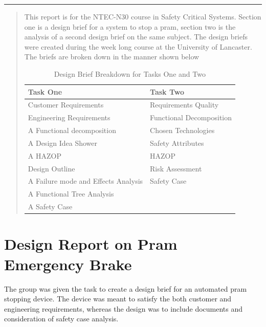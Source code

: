 \documentclass[12pt,a4paper]{article}
\begin{document}
\thispagestyle{fancy}
\renewcommand{\contentsname}{List of Contents{\color{Blue} \hrule width300pt height0.02pt}}
\textcolor{Grey}{\tableofcontents}
\renewcommand{\listfigurename}{List of Figures {\color{Blue} \hrule width250pt height0.01pt}}
\textcolor{Grey}{\listoffigures}
\renewcommand{\listtablename}{List of Tables {\color{Blue} \hrule width250pt height0.01pt}}
\textcolor{Grey}{\listoftables}
\newpage


\thispagestyle{abstract}
\renewcommand{\abstractname}{\large \textsf{Executive Summary} {\color{Blue} \hrule width250pt height0.01pt}}\hrule width0pt height0pt \bigskip
\begin{abstract}\bigskip\bigskip
This report is for the NTEC-N30 course in Safety Critical Systems. Section one is a design brief for a system to stop a pram, section two is the analysis of a second design brief on the same subject. The design briefs were created during the week long course at the University of Lancaster. The briefs are broken down in the manner shown below \\

\begin{table}[H]
\label{tab:win}
	\begin{center}
	\begin{tabular}{p{}|p{}}
\toprule 
{\bf Task One} & {\bf Task Two}\\
\midrule
Customer Requirements & Requirements Quality\\
Engineering Requirements & Functional Decomposition\\
A Functional decomposition & Chosen Technologies\\
A Design Idea Shower & Safety Attributes\\
A HAZOP & HAZOP\\
Design Outline & Risk Assessment\\
A Failure mode and Effects Analysis & Safety Case\\
A Functional Tree Analysis & \\
A Safety Case & \\
\bottomrule
	\end{tabular}
\end{center}
\caption{Design Brief Breakdown for Tasks One and Two}
\end{table}
\end{abstract}
\newpage

\thispagestyle{fancy}
\section[Task One]{Design Report on Pram Emergency Brake}\medskip
The group was given the task to create a design brief for an automated pram stopping device. The device was meant to satisfy the both customer and engineering requirements, whereas the design was to include documents and consideration of safety case analysis. 
\end{document}
